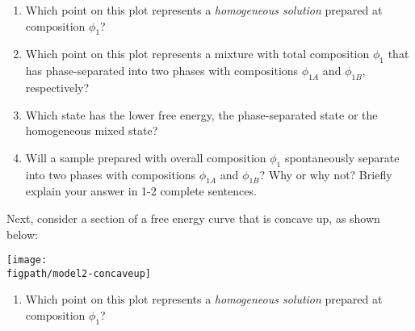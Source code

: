 \begin{activity}
\begin{ctqs}
			\begin{enumerate}
				\item Which point on this plot represents a \emph{homogeneous solution} prepared at composition $\phi_1$?
					
					\begin{solution}[0.75in]
					\end{solution}
					
				\item Which point on this plot represents a mixture with total composition $\phi_1$ that has phase-separated into two phases with compositions $\phi_{1A}$ and $\phi_{1B}$, respectively?
					
					\begin{solution}[0.75in]
					\end{solution}
					
				\item Which state has the lower free energy, the phase-separated state or the homogeneous mixed state?
					
					\begin{solution}[0.75in]
					\end{solution}
					
				\item Will a sample prepared with overall composition $\phi_1$ spontaneously separate into two phases with compositions $\phi_{1A}$ and $\phi_{1B}$?  Why or why not?  Briefly explain your answer in 1-2 complete sentences.
					
					\begin{solution}[1.5in]
					\end{solution}
					
			\end{enumerate}
			
		\clearpage
		\question Next, consider a section of a free energy curve that is concave up, as shown below:
	
		\vspace{0.1in}
		\centerline{\texttt{[image: \\figpath/model2-concaveup]}}

			\begin{enumerate}
				\item Which point on this plot represents a \emph{homogeneous solution} prepared at composition $\phi_1$?
					
					\begin{solution}[0.75in]
					\end{solution}
					

\end{enumerate}
\end{ctqs}
\end{activity}
